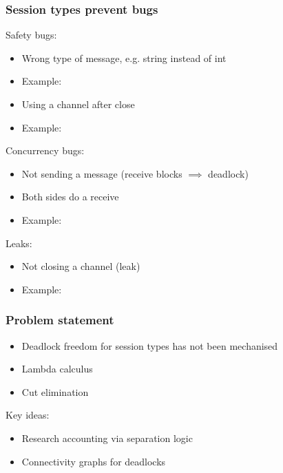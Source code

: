 \documentclass[aspectratio=169]{beamer}
\begin{document}
\begin{frame}[fragile]
  \frametitle{Session types prevent bugs}

  Safety bugs:
  \begin{itemize}
    \item Wrong type of message, e.g. string instead of int
    \item Example:
    \item Using a channel after close
    \item Example:
  \end{itemize}

  Concurrency bugs:
  \begin{itemize}
    \item Not sending a message (receive blocks $\implies$ deadlock)
    \item Both sides do a receive
    \item Example:
  \end{itemize}

  Leaks:
  \begin{itemize}
    \item Not closing a channel (leak)
    \item Example:
  \end{itemize}
\end{frame}


\begin{frame}[fragile]
  \frametitle{Problem statement}

  \begin{itemize}
    \item Deadlock freedom for session types has not been mechanised
    \item Lambda calculus
    \item Cut elimination
  \end{itemize}

  Key ideas:
  \begin{itemize}
    \item Research accounting via separation logic
    \item Connectivity graphs for deadlocks
  \end{itemize}
\end{frame}
\end{document}
